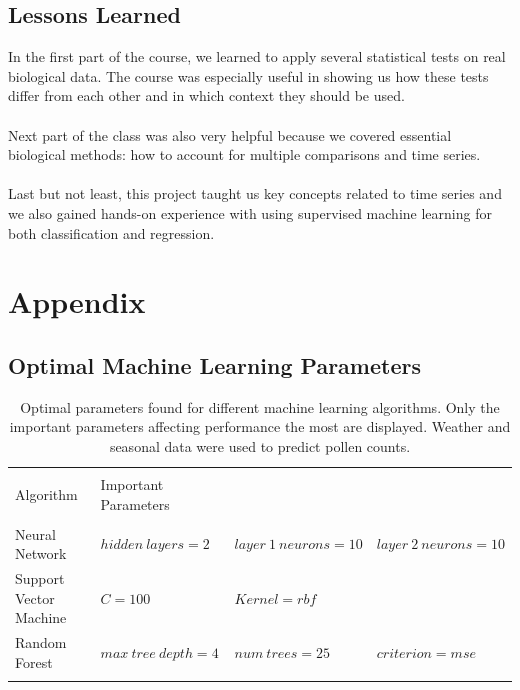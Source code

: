 \documentclass[a4paper,11pt]{article}
\begin{document}
\subsection*{Lessons Learned}
In the first part of the course, we learned to apply several statistical tests on real biological data. The course was especially useful in showing us how these tests differ from each other and in which context they should be used.\\\\
Next part of the class was also very helpful because we covered essential biological methods: how to account for multiple comparisons and time series.\\\\
Last but not least, this project taught us key concepts related to time series and we also gained hands-on experience with using supervised machine learning for both classification and regression.
{}



\section*{Appendix}

\subsection*{Optimal Machine Learning Parameters}
\begin{table}[h!]
	\centering
	\begin{tabular}{llll}
		\hline \\
		\vspace{0.6em}
		Algorithm & Important Parameters &  &    \\
		\hline \\
		\vspace{0.2em}
		Neural Network & $hidden\ layers=2$ & $layer\ 1\ neurons=10$  & $layer\ 2\ neurons=10$ \\
		\vspace{0.2em}
		Support Vector Machine & $C=100$ & $Kernel=rbf$  &   \\
		\vspace{0.2em}
		Random Forest & $max\ tree\ depth=4$ & $num\ trees=25$  & $criterion=mse$  \\ \vspace{-0.4em} \\
		\hline
	\end{tabular}
	\caption{Optimal parameters found for different machine learning algorithms. Only the important parameters affecting performance the most are displayed. Weather and seasonal data were used to predict pollen counts.}
	\label{tab:optimal}
\end{table}
\end{document}

